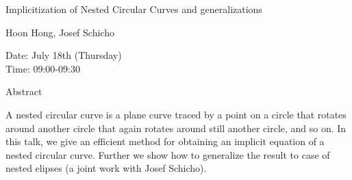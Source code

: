 \begin{center}
\LARGE
Implicitization of Nested Circular Curves and
                         generalizations

\end{center}

\begin{center}
\Large
Hoon Hong, Josef Schicho

\end{center}

\noindent
Date:  July 18th (Thursday) \\
Time:  09:00-09:30\\

\begin{center}
\large
Abstract
\end{center}

A nested circular curve is a plane curve traced by a point on a circle that rotates around another
circle that again rotates around still another circle, and so on. In this talk, we give an efficient
method for obtaining an implicit equation of a nested circular curve. Further we show how to
generalize the result to case of nested elipses (a joint work with Josef Schicho). 

